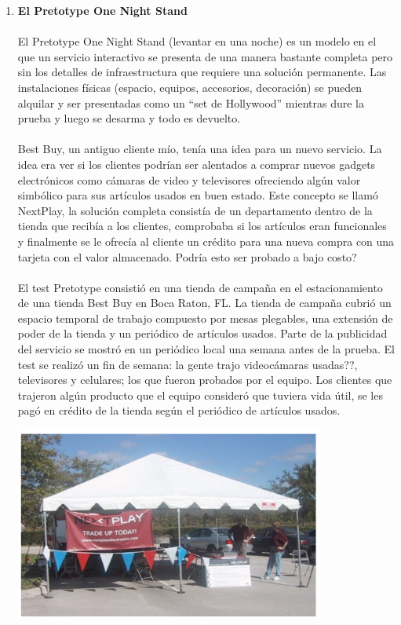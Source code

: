 \documentclass{article}
\begin{document}
\begin{enumerate}
 \item \textbf{El Pretotype One Night Stand}
 \\ \\
 El Pretotype One Night Stand (levantar en una noche) es un modelo en el que un servicio interactivo se presenta de una manera bastante completa  pero sin los detalles de infraestructura que requiere una soluci\'on permanente. Las instalaciones f\'isicas (espacio, equipos, accesorios, decoraci\'on) se pueden alquilar y ser presentadas como un ``set de Hollywood'' mientras dure la prueba y luego se desarma y todo es devuelto.
 \\ \\
Best Buy, un antiguo cliente m\'io, ten\'ia una idea para un nuevo servicio. La idea era ver si los clientes podr\'ian ser alentados a comprar nuevos gadgets electr\'onicos como c\'amaras de video y televisores ofreciendo alg\'un valor simb\'olico para sus art\'iculos usados en buen estado. Este concepto  se llam\'o NextPlay, la soluci\'on completa consist\'ia de un departamento dentro de la tienda que recib\'ia a los clientes, comprobaba si los art\'iculos eran funcionales y finalmente se le ofrec\'ia al cliente un cr\'edito para una nueva compra con una tarjeta con el valor almacenado. Podr\'ia esto ser probado a bajo costo?
\\ \\
El test Pretotype consisti\'o en una tienda de campa\~na en el estacionamiento de una tienda Best Buy en Boca Raton, FL. La tienda de campa\~na cubri\'o un espacio temporal de trabajo compuesto por mesas plegables, una extensi\'on de poder de la tienda y un peri\'odico de art\'iculos usados. Parte de la publicidad del servicio se mostr\'o en un peri\'odico local una semana antes de la prueba. El test se realiz\'o un fin de semana: la gente trajo videoc\'amaras usadas??, televisores y celulares; los que fueron probados por el equipo. Los clientes que trajeron alg\'un producto que el equipo consider\'o que tuviera vida \'util, se les pag\'o en cr\'edito de la tienda seg\'un el peri\'odico de art\'iculos usados.

\begin{center}
    \includegraphics[width=0.8\textwidth]{best_buy}
\end{center}


\end{enumerate}
\end{document}
